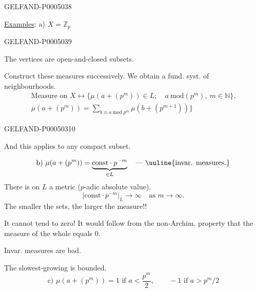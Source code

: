 \begin{GelfandAdjacentEvidence}{GELFAND-P000503}{8}


\uline{Examples}: a) $X=\mathbb Z_p$
\end{GelfandAdjacentEvidence}
\begin{GelfandAdjacentEvidence}{GELFAND-P000503}{9}


The vertices are open-and-closed subsets.

Construct these measures successively. We obtain a fund. syst. of neighbourhoods.
\[
\begin{gathered}
\text{Measure on }X\leftrightarrow
\{\mu(a+(p^m))\in L;\quad a\ \mathrm{mod}(p^m),\ m\in\mathbb N\}.\\
\mu(a+(p^m))=\sum_{b\equiv a\ \mathrm{mod}\ p^m}\mu(b+(p^{m+1}))\}
\end{gathered}
\]
\end{GelfandAdjacentEvidence}
\begin{GelfandAdjacentEvidence}{GELFAND-P000503}{10}


And this applies to any compact subset.

\[
\text{b) }\mu(a+(p^m))=\underbrace{\mathrm{const}\cdot p^{-m}}_{\in L}
\quad\text{— \uuline{invar. measures.}}
\]
There is on $L$ a metric ($p$-adic absolute value).
\[
|\mathrm{const}\cdot p^{-m}|_L\longrightarrow\infty\quad
\text{as }m\longrightarrow\infty.
\]
The smaller the sets, the larger the measure!!

It cannot tend to zero! It would follow from the non-Archim. property that the measure of the whole equals $0$.

Invar. measures are bad.

The slowest-growing is bounded.
\[
\text{c) }\mu(a+(p^m))=1\text{ if }a<\frac{p^m}{2},\qquad
-1\text{ if }a>p^m/2
\]
\end{GelfandAdjacentEvidence}
